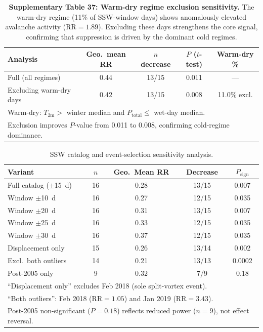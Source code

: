 \documentclass[11pt,letterpaper]{article}
\begin{document}
\begin{table}[h!]
\centering
\caption{\textbf{Supplementary Table 37: Warm-dry regime exclusion sensitivity.} The warm-dry regime (11\% of SSW-window days) shows anomalously elevated avalanche activity ($\mathrm{RR} = 1.89$). Excluding these days strengthens the core signal, confirming that suppression is driven by the dominant cold regimes.}
\label{tab:warm_dry_excl}
\begin{tabular}{lcccc}
\toprule
Analysis & Geo.\ mean RR & $n$ decrease & $P$ ($t$-test) & Warm-dry \% \\
\midrule
Full (all regimes) & 0.44 & 13/15 & 0.011 & --- \\
Excluding warm-dry days & 0.42 & 13/15 & 0.008 & 11.0\% excl. \\
\bottomrule
\multicolumn{5}{l}{\footnotesize Warm-dry: $T_{\mathrm{2m}} > $ winter median and $P_{\mathrm{total}} \leq$ wet-day median.} \\
\multicolumn{5}{l}{\footnotesize Exclusion improves $P$-value from 0.011 to 0.008, confirming cold-regime dominance.} \\
\end{tabular}
\end{table}

\begin{table}[htbp]
\centering
\caption{SSW catalog and event-selection sensitivity analysis.}
\label{tab:ssw_catalog}
\begin{tabular}{lcccc}
\hline
Variant & $n$ & Geo.\ Mean RR & Decrease & $P_{\mathrm{sign}}$ \\
\hline
Full catalog ($\pm$15~d) & 16 & 0.28 & 13/15 & 0.007 \\
Window $\pm$10~d & 16 & 0.27 & 12/15 & 0.035 \\
Window $\pm$20~d & 16 & 0.31 & 13/15 & 0.007 \\
Window $\pm$25~d & 16 & 0.33 & 12/15 & 0.035 \\
Window $\pm$30~d & 16 & 0.37 & 12/15 & 0.035 \\
Displacement only & 15 & 0.26 & 13/14 & 0.002 \\
Excl.\ both outliers & 14 & 0.21 & 13/13 & 0.0002 \\
Post-2005 only & 9 & 0.32 & 7/9 & 0.18 \\
\hline
\multicolumn{5}{l}{\footnotesize ``Displacement only'' excludes Feb 2018 (sole split-vortex event).} \\
\multicolumn{5}{l}{\footnotesize ``Both outliers'': Feb 2018 ($\mathrm{RR}=1.05$) and Jan 2019 ($\mathrm{RR}=3.43$).} \\
\multicolumn{5}{l}{\footnotesize Post-2005 non-significant ($P=0.18$) reflects reduced power ($n=9$), not effect reversal.} \\
\end{tabular}
\end{table}
\end{document}
